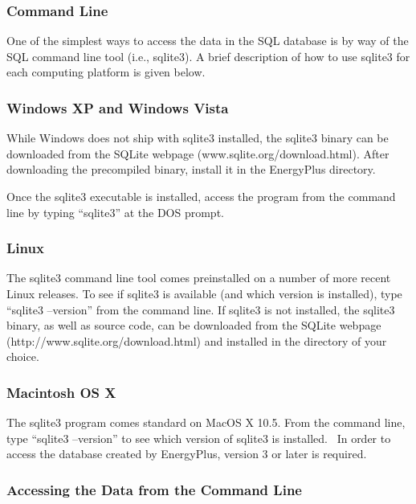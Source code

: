\subsubsection{Command Line}\label{command-line}

One of the simplest ways to access the data in the SQL database is by way of the SQL command line tool (i.e., sqlite3). A brief description of how to use sqlite3 for each computing platform is given below.

\subsubsection{Windows XP and Windows Vista}\label{windows-xp-and-windows-vista}

While Windows does not ship with sqlite3 installed, the sqlite3 binary can be downloaded from the SQLite webpage (www.sqlite.org/download.html). After downloading the precompiled binary, install it in the EnergyPlus directory.

Once the sqlite3 executable is installed, access the program from the command line by typing ``sqlite3'' at the DOS prompt.

\subsubsection{Linux}\label{linux}

The sqlite3 command line tool comes preinstalled on a number of more recent Linux releases. To see if sqlite3 is available (and which version is installed), type ``sqlite3 --version'' from the command line. If sqlite3 is not installed, the sqlite3 binary, as well as source code, can be downloaded from the SQLite webpage (http://www.sqlite.org/download.html) and installed in the directory of your choice.

\subsubsection{Macintosh OS X}\label{macintosh-os-x}

The sqlite3 program comes standard on MacOS X 10.5. From the command line, type ``sqlite3 --version'' to see which version of sqlite3 is installed.~ In order to access the database created by EnergyPlus, version 3 or later is required.

\subsubsection{Accessing the Data from the Command Line}\label{accessing-the-data-from-the-command-line}


